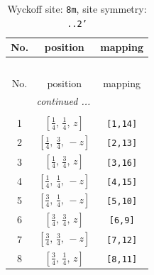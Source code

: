 \documentclass[fleqn,8pt]{jsarticle}
\begin{document}
\renewcommand{\arraystretch}{1.2}
\begin{longtable}{ccc}
\caption{Wyckoff site: {\tt 8m}, site symmetry: {\tt ..2'}}
 \\
 \hline \hline
No. & position & mapping \\ \hline \endfirsthead

\multicolumn{2}{l}{\tablename\ \thetable{}} \\
 \hline \hline
No. & position & mapping \\ \hline \endhead

 \hline \hline
\multicolumn{2}{r}{\footnotesize\it continued ...} \\ \endfoot

 \hline \hline
\multicolumn{2}{r}{} \\ \endlastfoot

1 & $\left[ \frac{1}{4},\, \frac{1}{4},\, z \right]$ & {\tt [1,14]} \\ \hline
2 & $\left[ \frac{1}{4},\, \frac{3}{4},\, - z \right]$ & {\tt [2,13]} \\ \hline
3 & $\left[ \frac{1}{4},\, \frac{3}{4},\, z \right]$ & {\tt [3,16]} \\ \hline
4 & $\left[ \frac{1}{4},\, \frac{1}{4},\, - z \right]$ & {\tt [4,15]} \\ \hline
5 & $\left[ \frac{3}{4},\, \frac{1}{4},\, - z \right]$ & {\tt [5,10]} \\ \hline
6 & $\left[ \frac{3}{4},\, \frac{3}{4},\, z \right]$ & {\tt [6,9]} \\ \hline
7 & $\left[ \frac{3}{4},\, \frac{3}{4},\, - z \right]$ & {\tt [7,12]} \\ \hline
8 & $\left[ \frac{3}{4},\, \frac{1}{4},\, z \right]$ & {\tt [8,11]} \\
\end{longtable}
\renewcommand{\arraystretch}{1.2}
\end{document}
